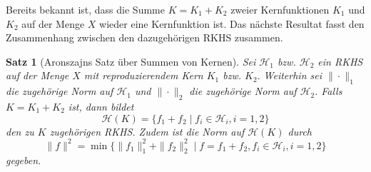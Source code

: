 \documentclass[12pt,titlepage,twoside,cleardoublepage]{article}
\theoremstyle{nummermitklammern}
\newtheorem{satz}[temp]{Satz}
\newtheorem{satz}[zahl]{Satz}
\numberwithin{equation}{section}
\begin{document}
Bereits bekannt ist, dass die Summe $K=K_1+K_2$ zweier Kernfunktionen $K_1$ und $K_2$ auf der Menge $X$ wieder eine Kernfunktion ist. Das nächste Resultat fasst den Zusammenhang zwischen den dazugehörigen RKHS zusammen. 
\begin{satz}[Aronszajns Satz über Summen von Kernen]
Sei $\mathcal{H}_1$ bzw. $\mathcal{H}_2$ ein RKHS auf der Menge $X$ mit reproduzierendem Kern $K_1$ bzw. $K_2.$ Weiterhin sei $\|\cdot\|_1$ die zugehörige Norm auf $\mathcal{H}_1$ und $\|\cdot\|_2$ die zugehörige Norm auf $\mathcal{H}_2.$ Falls $K=K_1+K_2$ ist, dann bildet 
 \[
\mathcal{H}(K)=\{f_1+f_2\mid f_i\in \mathcal{H}_i,i=1,2\} 
 \] 
 den zu $K$ zugehörigen RKHS. Zudem ist die Norm auf $\mathcal{H}(K)$ durch 
 \[
\|f\|^2=\min\{\|f_1\|_1^2+\|f_2\|_2^2\mid f=f_1+f_2,f_i\in \mathcal{H}_i,i=1,2\} 
 \]
 gegeben.
\end{satz}
\end{document}
